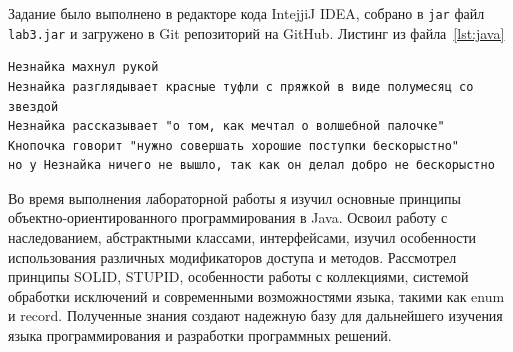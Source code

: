 
    \newpage
    Задание было выполнено в редакторе кода IntejjiJ IDEA, собрано в \verb|jar| файл \verb|lab3.jar| и загружено в Git репозиторий на GitHub.
    Листинг из файла~\ref{lst:java}
    





    \begin{lstlisting}[caption={Результат выполнения программы},label={lst:result}]
        Незнайка махнул рукой
Незнайка разглядывает красные туфли с пряжкой в виде полумесяц со звездой
Незнайка рассказывает "о том, как мечтал о волшебной палочке"
Кнопочка говорит "нужно совершать хорошие поступки бескорыстно"
но у Незнайка ничего не вышло, так как он делал добро не бескорыстно
    \end{lstlisting}

    Во время выполнения лабораторной работы я изучил основные принципы объектно-ориентированного программирования в Java.
    Освоил работу с наследованием, абстрактными классами, интерфейсами, изучил особенности использования различных модификаторов доступа и методов.
    Рассмотрел принципы SOLID, STUPID, особенности работы с коллекциями, системой обработки исключений и современными возможностями языка, такими как enum и record.
    Полученные знания создают надежную базу для дальнейшего изучения языка программирования и разработки программных решений.
    \newpage





